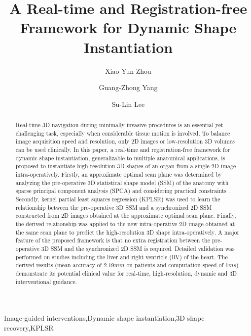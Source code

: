 \documentclass[review]{elsarticle}
\begin{document}
\begin{frontmatter}
\title{A Real-time and Registration-free Framework for Dynamic Shape Instantiation}
\author{Xiao-Yun Zhou}
\author{Guang-Zhong Yang}
\author{Su-Lin Lee}
\address{The Hamlyn Centre for Robotic Surgery, Imperial College London, London, UK}

\begin{abstract}
Real-time 3D navigation during minimally invasive procedures is an essential yet challenging task, especially when considerable tissue motion is involved. To balance image acquisition speed and resolution, only 2D images or low-resolution 3D volumes can be used clinically. In this paper, a real-time and registration-free framework for dynamic shape instantiation, generalizable to multiple anatomical applications, is proposed to instantiate high-resolution 3D shapes of an organ from a single 2D image intra-operatively. Firstly, an approximate optimal scan plane was determined by analyzing the pre-operative 3D statistical shape model (SSM) of the anatomy with sparse principal component analysis (SPCA) and considering practical constraints . Secondly, kernel partial least squares regression (KPLSR) was used to learn the relationship between the pre-operative 3D SSM and a synchronized 2D SSM constructed from 2D images obtained at the approximate optimal scan plane. Finally, the derived relationship was applied to the new intra-operative 2D image obtained at the same scan plane to predict the high-resolution 3D shape intra-operatively. A major feature of the proposed framework is that no extra registration between the pre-operative 3D SSM and the synchronized 2D SSM is required. Detailed validation was performed on studies including the liver and right ventricle (RV) of the heart. The derived results (mean accuracy of $2.19mm$ on patients and computation speed of $1ms$) demonstrate its potential clinical value for real-time, high-resolution, dynamic and 3D interventional guidance. 
\end{abstract}

\begin{keyword}
Image-guided interventions\sep Dynamic shape instantiation\sep 3D shape recovery\sep KPLSR
\end{keyword}
\end{frontmatter}
\end{document}
